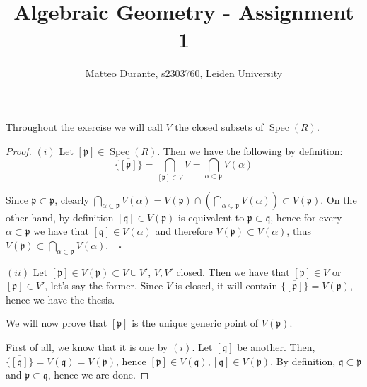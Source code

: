 \documentclass{article}
\newcommand{\pid}{\mathfrak{p}}
\newcommand{\qid}{\mathfrak{q}}
\newcommand{\exercise}[1]{\noindent {\bf Exercise #1}}
\DeclareMathOperator{\Spec}{Spec}
\begin{document}
\title{Algebraic Geometry - Assignment 1}

\author{Matteo Durante, s2303760, Leiden University}

\maketitle

\exercise{1}

Throughout the exercise we will call $V$ the closed subsets of $\Spec(R)$.

\begin{proof}
$(i)$ Let $[\pid]\in\Spec(R)$. Then we have the following by definition:
$$\overline{\{[\pid]\}}=\bigcap_{[\pid]\in V} V=\bigcap_{\alpha\subset\pid}
V(\alpha)$$

Since $\pid\subset\pid$, clearly $\bigcap_{\alpha\subset\pid}
V(\alpha)=V(\pid)\cap (\bigcap_{\alpha\subsetneq\pid} V(\alpha))\subset V(\pid)$.
On the other hand, by definition $[\qid]\in V(\pid)$ is equivalent to
$\pid\subset\qid$, hence for every $\alpha\subset\pid$ we have that $[\qid]\in
V(\alpha)$ and therefore $V(\pid)\subset V(\alpha)$, thus
$V(\pid)\subset\bigcap_{\alpha\subset\pid} V(\alpha)$.$\quad\square$

\proof $(ii)$ Let $[\pid]\in V(\pid)\subset V\cup V'$, $V,V'$ closed. Then we
have that $[\pid]\in V$ or $[\pid]\in V'$, let's say the former. Since $V$ is
closed, it will contain $\overline{\{[\pid]\}}=V(\pid)$, hence we have the thesis.

We will now prove that $[\pid]$ is the unique generic point of $V(\pid)$.

First of all, we know that it is one by $(i)$. Let $[\qid]$ be another. Then,
$\overline{\{[\qid]\}}=V(\qid)=V(\pid)$, hence $[\pid]\in V(\qid),[\qid]\in
V(\pid)$. By definition, $\qid\subset\pid$ and $\pid\subset\qid$, hence we are
done.
\end{proof}
\end{document}
